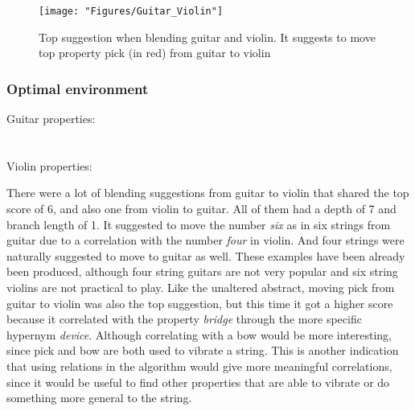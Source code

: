 \begin{figure}[h] \centering \texttt{[image: "Figures/Guitar\_Violin"]} \caption[Blending guitar and violin]{Top suggestion when blending guitar and violin. It suggests to move top property pick (in red) from guitar to violin } \label{fig:Guitar-Violin} \end{figure}

\subsubsection{Optimal environment}

Guitar properties:\\
\noindent{}	
\\\\Violin properties:\\
\noindent{}
		

There were a lot of blending suggestions from guitar to violin that shared the top score of 6, and also one from violin to guitar. All of them had a depth of 7 and branch length of 1. It suggested to move the number \emph{six} as in six strings from guitar due to a correlation with the number \emph{four} in violin. And four strings were naturally suggested to move to guitar as well. These examples have been already been produced, although four string guitars are not very popular and six string violins are not practical to play. Like the unaltered abstract, moving pick from guitar to violin was also the top suggestion, but this time it got a higher score because it correlated with the property \emph{bridge} through the more specific hypernym \emph{device}. Although correlating with a bow would be more interesting, since pick and bow are both used to vibrate a string. This is another indication that using relations in the algorithm would give more meaningful correlations, since it would be useful to find other properties that are able to vibrate or do something more general to the string.

